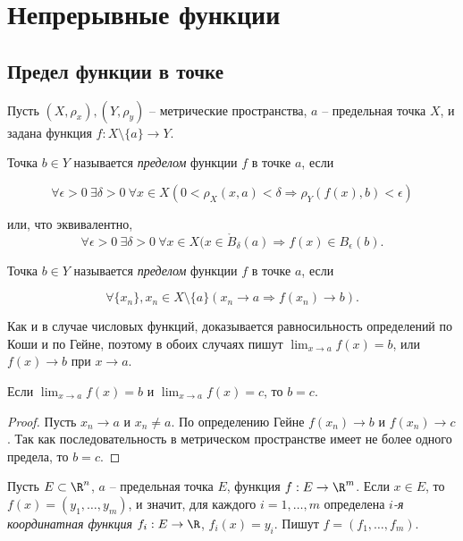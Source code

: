 
\section{Непрерывные функции}

\subsection{Предел функции в точке}

Пусть $(X, \rho_{x}), (Y, \rho_{y})$ -- метрические пространства, $a$ -- предельная точка $X$, и задана функция $f: X \setminus \{a\} \to Y$.

\begin{definition}[Коши]
    Точка $b \in Y$ называется \textit{пределом} функции $f$ в точке $a$, если
    
    \[\forall \epsilon > 0 \ \exists \delta > 0 \ \forall x \in X (0 < \rho_{X}(x, a) < \delta \Rightarrow \rho_{Y}(f(x), b) < \epsilon)\]
    
    или, что эквивалентно,
    \[\forall \epsilon > 0 \ \exists \delta > 0 \ \forall x \in X (x \in \mathring{B}_{\delta}(a) \Rightarrow f(x) \in B_{\epsilon}(b).\]
\end{definition}

\begin{definition}[Гейне]
    Точка $b \in Y$ называется \textit{пределом} функции $f$ в точке $a$, если
    
    \[\forall \{x_{n}\}, x_{n} \in X \setminus \{a\} (x_{n} \to a \Rightarrow f(x_{n}) \to b).\]
    
\end{definition}

Как и в случае числовых функций, доказывается равносильность определений по Коши и по Гейне, поэтому в обоих случаях пишут $\lim_{x \to a}f(x) = b$, или $f(x) \to b$ при $x \to a$.

\begin{property}[единственность]
    Если $\lim_{x \to a}f(x) = b$ и $\lim_{x \to a}f(x) = c$, то $b = c$.
\end{property}

\begin{proof}
    Пусть $x_{n} \to a$ и $x_{n} \neq a$. По определению Гейне $f(x_{n}) \to b$ и $f(x_{n}) \to c$. Так как последовательность в метрическом пространстве имеет не более одного предела, то $b = c$.
\end{proof}

\begin{note}
    Пусть $E \subset \R^{n}$, $a$ -- предельная точка $E$, функция $f: E \to \R^{m}$. Если $x \in E$, то $f(x) = (y_{1}, \ldots, y_{m})$, и значит, для каждого $i = 1, \ldots, m$ определена \textit{$i$-я координатная функция} $f_{i}: E \to \R$, $f_{i}(x) = y_{i}$. Пишут $f = (f_{1}, \ldots, f_{m})$.
\end{note}

